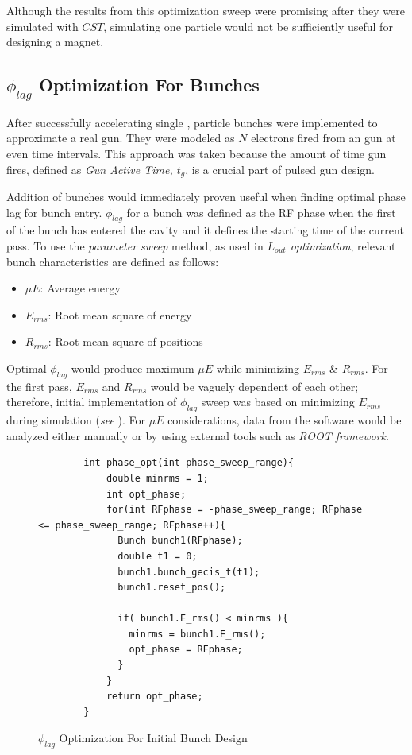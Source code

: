 \documentclass[a4paper,oneside,12pt]{report}
\numberwithin{equation}{chapter}
\begin{document}
Although the results from this optimization sweep were promising after they were simulated with $CST$, simulating one particle would not be sufficiently useful for designing a magnet.

\subsection{$\phi_{lag}$ Optimization For Bunches} \label{sec:philag_sweep}
After successfully accelerating single \e, particle bunches were implemented to approximate a real \e gun. 
They were modeled as $N$ electrons fired from an \e gun at even time intervals. This approach was taken because the amount of time gun fires, defined as \textit{Gun Active Time, $t_g$}, is a crucial part of pulsed \e gun design.

Addition of bunches would immediately proven useful when finding optimal phase lag for bunch entry.
$\phi_{lag}$ for a bunch was defined as the RF phase when the first \e of the bunch has entered the cavity and it defines the starting time of the current pass.
To use the \textit{parameter sweep} method, as used in \textit{$L_{out}$ optimization}, relevant bunch characteristics are defined as follows:
\begin{itemize}
    \item $\mu E$: Average energy
    \item $E_{rms}$: Root mean square of energy
    \item $R_{rms}$: Root mean square of \e positions
\end{itemize}
Optimal $\phi_{lag}$ would produce maximum $\mu E$ while minimizing $E_{rms}$ \& $R_{rms}$. For the first pass, 
$E_{rms}$ and $R_{rms}$ would be vaguely dependent of each other; therefore, initial implementation of $\phi_{lag}$ sweep was based on minimizing $E_{rms}$ during simulation (\textit{see }). 
For $\mu E$ considerations, data from the software would be analyzed either manually or by using external tools such as \textit{ROOT framework}. 
\begin{figure}[H]
    \centering
    \captionsetup{justification=centering}
    \begin{verbatim}
        int phase_opt(int phase_sweep_range){
            double minrms = 1;
            int opt_phase;
            for(int RFphase = -phase_sweep_range; RFphase <= phase_sweep_range; RFphase++){
              Bunch bunch1(RFphase);
              double t1 = 0;
              bunch1.bunch_gecis_t(t1);
              bunch1.reset_pos();
        
              if( bunch1.E_rms() < minrms ){
                minrms = bunch1.E_rms();
                opt_phase = RFphase;
              }
            }
            return opt_phase;
        }
    \end{verbatim}
    \caption{$\phi_{lag}$ Optimization For Initial Bunch Design}
    \label{fig:phlag_opt}
\end{figure}
\end{document}
